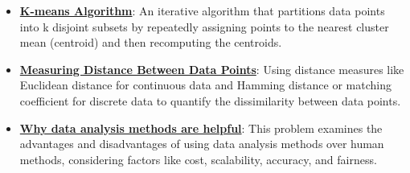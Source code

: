 \documentclass{article}%
\begin{document}
\begin{itemize}[leftmargin=*]
\item \href{https://purdue.brightspace.com/d2l/common/assets/pdfjs-d2l-dist/1.0.14-legacy/web/viewer.html?file=%2Fcontent%2Fenforced%2F1095467-wl.202510.CS.24300.001%2F12L2-distance-clusters.pdf%3Fou%3D1095467&lang=en-us&container=d2l-fileviewer-rendered-pdf&fullscreen=d2l-fileviewer-rendered-pdf-dialog&height=667#page=22}{\textbf{K-means Algorithm}}: An iterative algorithm that partitions data points into k disjoint subsets by repeatedly assigning points to the nearest cluster mean (centroid) and then recomputing the centroids.%
\item \href{https://purdue.brightspace.com/d2l/common/assets/pdfjs-d2l-dist/1.0.14-legacy/web/viewer.html?file=%2Fcontent%2Fenforced%2F1095467-wl.202510.CS.24300.001%2F12L2-distance-clusters.pdf%3Fou%3D1095467&lang=en-us&container=d2l-fileviewer-rendered-pdf&fullscreen=d2l-fileviewer-rendered-pdf-dialog&height=667#page=17}{\textbf{Measuring Distance Between Data Points}}: Using distance measures like Euclidean distance for continuous data and Hamming distance or matching coefficient for discrete data to quantify the dissimilarity between data points.%
\item \href{https://purdue.brightspace.com/d2l/common/assets/pdfjs-d2l-dist/1.0.14-legacy/web/viewer.html?file=%2Fcontent%2Fenforced%2F1095467-wl.202510.CS.24300.001%2F16L2-ethics.pdf%3Fou%3D1095467&lang=en-us&container=d2l-fileviewer-rendered-pdf&fullscreen=d2l-fileviewer-rendered-pdf-dialog&height=667#page=3}{\textbf{Why data analysis methods are helpful}}: This problem examines the advantages and disadvantages of using data analysis methods over human methods, considering factors like cost, scalability, accuracy, and fairness.%
\end{itemize}

%
\end{document}
